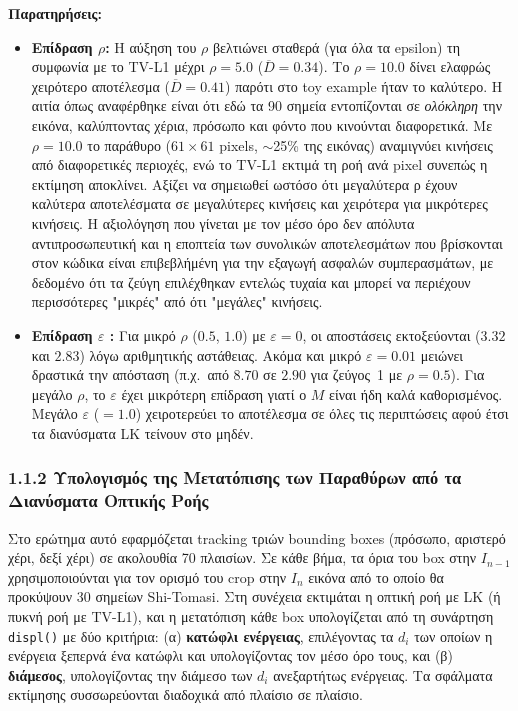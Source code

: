 \documentclass[12pt]{article}
\begin{document}
\textbf{Παρατηρήσεις:}
\begin{itemize}
    \item \textbf{Επίδραση $\rho$:} Η αύξηση του $\rho$ βελτιώνει σταθερά (για όλα τα epsilon) τη συμφωνία με το TV-L1 μέχρι $\rho=5.0$ ($\overline{D}=0.34$). Το $\rho=10.0$ δίνει ελαφρώς χειρότερο αποτέλεσμα ($\overline{D}=0.41$) παρότι στο toy example ήταν το καλύτερο. Η αιτία όπως αναφέρθηκε είναι ότι εδώ τα 90 σημεία εντοπίζονται σε \textit{ολόκληρη} την εικόνα, καλύπτοντας χέρια, πρόσωπο και φόντο που κινούνται διαφορετικά. Με $\rho=10.0$ το παράθυρο ($61\times61$ pixels, $\sim$25\% της εικόνας) αναμιγνύει κινήσεις από διαφορετικές περιοχές, ενώ το TV-L1 εκτιμά τη ροή ανά pixel συνεπώς η εκτίμηση αποκλίνει. Αξίζει να σημειωθεί ωστόσο ότι μεγαλύτερα ρ έχουν καλύτερα αποτελέσματα σε μεγαλύτερες κινήσεις και χειρότερα για μικρότερες κινήσεις. Η αξιολόγηση που γίνεται με τον μέσο όρο δεν απόλυτα αντιπροσωπευτική και η εποπτεία των συνολικών αποτελεσμάτων που βρίσκονται στον κώδικα είναι επιβεβλήμένη για την εξαγωγή ασφαλών συμπερασμάτων, με δεδομένο ότι τα ζεύγη επιλέχθηκαν εντελώς τυχαία και μπορεί να περιέχουν περισσότερες "μικρές" από ότι "μεγάλες" κινήσεις.

    \item \textbf{Επίδραση $\varepsilon$ :} Για μικρό $\rho$ ($0.5$, $1.0$) με $\varepsilon=0$, οι αποστάσεις εκτοξεύονται ($3.32$ και $2.83$) λόγω αριθμητικής αστάθειας. Ακόμα και μικρό $\varepsilon=0.01$ μειώνει δραστικά την απόσταση (π.χ.\ από $8.70$ σε $2.90$ για ζεύγος~1 με $\rho=0.5$). Για μεγάλο $\rho$, το $\varepsilon$ έχει μικρότερη επίδραση γιατί ο $M$ είναι ήδη καλά καθορισμένος. Μεγάλο $\varepsilon$ ($=1.0$) χειροτερεύει το αποτέλεσμα σε όλες τις περιπτώσεις αφού έτσι τα διανύσματα LK τείνουν στο μηδέν.

\end{itemize}
\subsubsection*{1.1.2 Υπολογισμός της Μετατόπισης των Παραθύρων από τα Διανύσματα Οπτικής
Ροής}

\hspace{0.6cm}Στο ερώτημα αυτό εφαρμόζεται tracking τριών bounding boxes (πρόσωπο, αριστερό χέρι, δεξί χέρι) σε ακολουθία 70 πλαισίων. Σε κάθε βήμα, τα όρια του box στην $Ι_{n-1}$ χρησιμοποιούνται για τον ορισμό του crop στην $I_{n}$ εικόνα από το οποίο θα προκύψουν 30 σημείων Shi-Tomasi. Στη συνέχεια εκτιμάται η οπτική ροή με LK (ή πυκνή ροή με TV-L1), και η μετατόπιση κάθε box υπολογίζεται από τη συνάρτηση \texttt{displ()} με δύο κριτήρια: (α) \textbf{κατώφλι ενέργειας}, επιλέγοντας τα $d_{i}$ των οποίων η ενέργεια ξεπερνά ένα κατώφλι και υπολογίζοντας τον μέσο όρο τους, και (β) \textbf{διάμεσος}, υπολογίζοντας την διάμεσο των $d_{i}$ ανεξαρτήτως ενέργειας. Τα σφάλματα εκτίμησης συσσωρεύονται διαδοχικά από πλαίσιο σε πλαίσιο.
\end{document}
